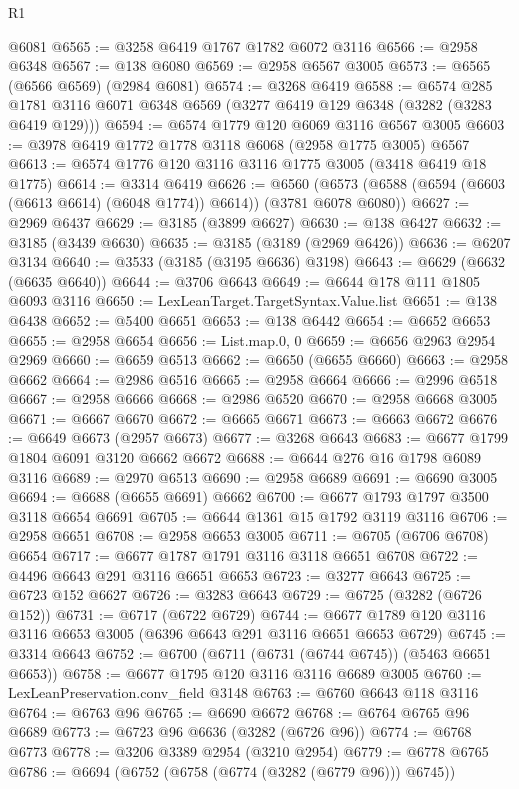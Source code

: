 \begin{lexlean}{R1}
\begin{coremodule}
    @6081
@6565 := @3258 @6419 @1767 @1782 @6072 @3116
@6566 := @2958 @6348
@6567 := @138 @6080
@6569 := @2958 @6567 @3005
@6573 := @6565 (@6566 @6569) (@2984 @6081)
@6574 := @3268 @6419
@6588 := @6574
    @285
    @1781
    @3116
    @6071
    @6348
    @6569
    (@3277 @6419 @129 @6348 (@3282 (@3283 @6419 @129)))
@6594 := @6574 @1779 @120 @6069 @3116 @6567 @3005
@6603 := @3978 @6419 @1772 @1778 @3118 @6068 (@2958 @1775 @3005) @6567
@6613 := @6574 @1776 @120 @3116 @3116 @1775 @3005 (@3418 @6419 @18 @1775)
@6614 := @3314 @6419
@6626 := @6560 (@6573 (@6588 (@6594 (@6603 (@6613 @6614) (@6048 @1774)) @6614)) (@3781 @6078 @6080))
@6627 := @2969 @6437
@6629 := @3185 (@3899 @6627)
@6630 := @138 @6427
@6632 := @3185 (@3439 @6630)
@6635 := @3185 (@3189 (@2969 @6426))
@6636 := @6207 @3134
@6640 := @3533 (@3185 (@3195 @6636) @3198)
@6643 := @6629 (@6632 (@6635 @6640))
@6644 := @3706 @6643
@6649 := @6644 @178 @111 @1805 @6093 @3116
@6650 := LexLeanTarget.TargetSyntax.Value.list
@6651 := @138 @6438
@6652 := @5400 @6651
@6653 := @138 @6442
@6654 := @6652 @6653
@6655 := @2958 @6654
@6656 := List.map.{0, 0}
@6659 := @6656 @2963 @2954 @2969
@6660 := @6659 @6513
@6662 := @6650 (@6655 @6660)
@6663 := @2958 @6662
@6664 := @2986 @6516
@6665 := @2958 @6664
@6666 := @2996 @6518
@6667 := @2958 @6666
@6668 := @2986 @6520
@6670 := @2958 @6668 @3005
@6671 := @6667 @6670
@6672 := @6665 @6671
@6673 := @6663 @6672
@6676 := @6649 @6673 (@2957 @6673)
@6677 := @3268 @6643
@6683 := @6677 @1799 @1804 @6091 @3120 @6662 @6672
@6688 := @6644 @276 @16 @1798 @6089 @3116
@6689 := @2970 @6513
@6690 := @2958 @6689
@6691 := @6690 @3005
@6694 := @6688 (@6655 @6691) @6662
@6700 := @6677 @1793 @1797 @3500 @3118 @6654 @6691
@6705 := @6644 @1361 @15 @1792 @3119 @3116
@6706 := @2958 @6651
@6708 := @2958 @6653 @3005
@6711 := @6705 (@6706 @6708) @6654
@6717 := @6677 @1787 @1791 @3116 @3118 @6651 @6708
@6722 := @4496 @6643 @291 @3116 @6651 @6653
@6723 := @3277 @6643
@6725 := @6723 @152 @6627
@6726 := @3283 @6643
@6729 := @6725 (@3282 (@6726 @152))
@6731 := @6717 (@6722 @6729)
@6744 := @6677 @1789 @120 @3116 @3116 @6653 @3005 (@6396 @6643 @291 @3116 @6651 @6653 @6729)
@6745 := @3314 @6643
@6752 := @6700 (@6711 (@6731 (@6744 @6745)) (@5463 @6651 @6653))
@6758 := @6677 @1795 @120 @3116 @3116 @6689 @3005
@6760 := LexLeanPreservation.conv_field @3148
@6763 := @6760 @6643 @118 @3116
@6764 := @6763 @96
@6765 := @6690 @6672
@6768 := @6764 @6765 @96 @6689
@6773 := @6723 @96 @6636 (@3282 (@6726 @96))
@6774 := @6768 @6773
@6778 := @3206 @3389 @2954 (@3210 @2954)
@6779 := @6778 @6765
@6786 := @6694 (@6752 (@6758 (@6774 (@3282 (@6779 @96))) @6745))

\end{coremodule}
\end{lexlean}
